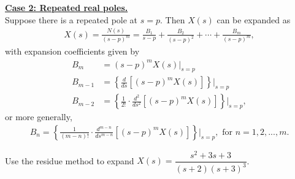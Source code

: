 \documentclass{report}
\begin{document}
\begin{tcolorbox}[width=\textwidth,colback={white}, sharp corners]
    \textbf{\underline{Case 2: Repeated real poles.}} \\[0.25cm]
    Suppose there is a repeated pole at $s=p$. Then $X(s)$ can be expanded as 
    \begin{align}
        X(s) = \frac{N(s)}{(s-p)^m} = \frac{B_1}{s-p} + \frac{B_2}{(s-p)^2} + \cdots + \frac{B_m}{(s-p)^m},
    \end{align}
    with expansion coefficients given by 
    \begin{align}
        B_m &= (s-p)^mX(s)\big|_{s=p} \\ 
        B_{m-1} &= \left\{\frac{d}{ds}\left[(s-p)^mX(s)\right]\right\}\bigg|_{s=p} \\ 
        B_{m-2} &= \left\{\frac{1}{2!}\cdot\frac{d^2}{ds^2}\left[(s-p)^mX(s)\right]\right\}\bigg|_{s=p}, 
    \end{align}
    or more generally, 
    \begin{align}
        B_n = \left\{\frac{1}{(m-n)!}\cdot\frac{d^{m-n}}{ds^{m-n}}\left[(s-p)^mX(s)\right]\right\}\bigg|_{s=p}, \text{ for } n=1,2,...,m.
    \end{align}
\end{tcolorbox}
\begin{example}
    Use the residue method to expand $X(s) = \dfrac{s^2+3s+3}{(s+2)(s+3)^3}$.\\
\end{example}
\end{document}
